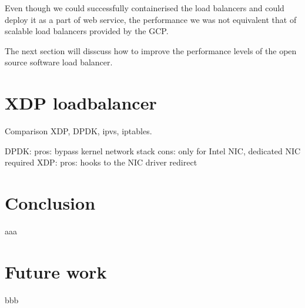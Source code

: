 Even though we could successfully containerised the load balancers and could deploy it as a part of web service, the performance we was not equivalent that of scalable load balancers provided by the GCP.

The next section will disscuss how to improve the performance levels of the open source software load balancer. 

\section{XDP loadbalancer}\label{XDP loadbalancer}


Comparison XDP, DPDK, ipvs, iptables.

DPDK: pros: bypass kernel network stack cons: only for Intel NIC, dedicated NIC required
XDP: pros: hooks to the NIC driver redirect 

\section{Conclusion}\label{Conclusion}
aaa

\section{Future work}\label{Future work}
bbb


